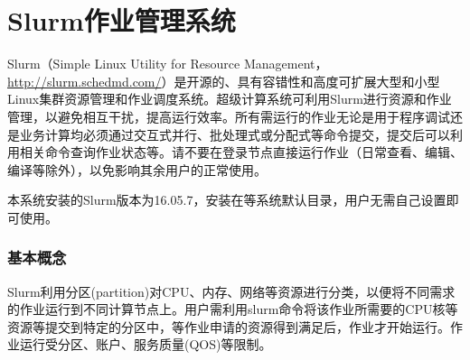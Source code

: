 \part{Slurm作业管理系统\label{slurm}}

Slurm（Simple Linux Utility for Resource Management，\url{http://slurm.schedmd.com/}）是开源的、具有容错性和高度可扩展大型和小型Linux集群资源管理和作业调度系统。超级计算系统可利用Slurm进行资源和作业管理，以避免相互干扰，提高运行效率。所有需运行的作业无论是用于程序调试还是业务计算均必须通过交互式并行、批处理式或分配式等命令提交，提交后可以利用相关命令查询作业状态等。请不要在登录节点直接运行作业（日常查看、编辑、编译等除外），以免影响其余用户的正常使用。

本系统安装的Slurm版本为16.05.7，安装在等系统默认目录，用户无需自己设置即可使用。

\section{基本概念}
Slurm利用分区(partition)对CPU、内存、网络等资源进行分类，以便将不同需求的作业运行到不同计算节点上。用户需利用slurm命令将该作业所需要的CPU核等资源等提交到特定的分区中，等作业申请的资源得到满足后，作业才开始运行。作业运行受分区、账户、服务质量(QOS)等限制。

